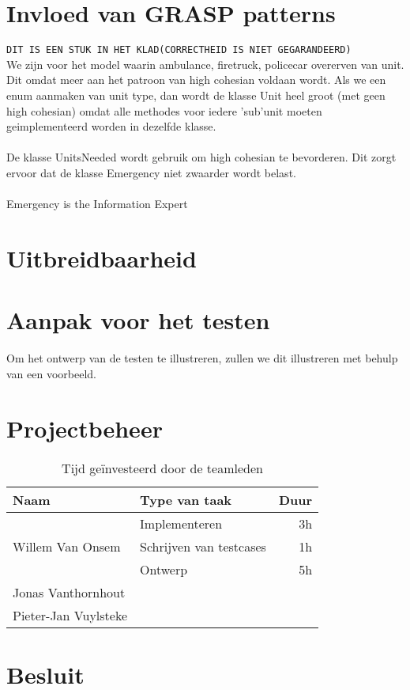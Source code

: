\documentclass[a4paper, titlepage,12pt]{article}
\begin{document}
\section{Invloed van GRASP patterns}
\verb+DIT IS EEN STUK IN HET KLAD(CORRECTHEID IS NIET GEGARANDEERD)+\\
We zijn voor het model waarin ambulance, firetruck, policecar overerven van unit. Dit omdat meer aan het patroon van high cohesian voldaan wordt. Als we een enum aanmaken van unit type, dan wordt de klasse Unit heel groot (met geen high cohesian) omdat alle methodes voor iedere 'sub'unit moeten geimplementeerd worden in dezelfde klasse.\\\\
De klasse UnitsNeeded wordt gebruik om high cohesian te bevorderen. Dit zorgt ervoor dat de klasse Emergency niet zwaarder wordt belast.\\\\
Emergency is the Information Expert   
\label{grasp}
\newpage
\section{Uitbreidbaarheid}
\label{uitbreidbaarheid}
\newpage
\section{Aanpak voor het testen}
\label{testen}
Om het ontwerp van de testen te illustreren, zullen we dit illustreren met behulp van een voorbeeld.

\newpage
\section{Projectbeheer}
\label{projectbeheer}
\begin{table}[H]
\centering
\begin{tabular}{|llr|}
\hline
Naam&Type van taak&Duur\\
\hline
\hline
\multirow{3}{*}{Willem Van Onsem}&Implementeren&3h\\
&Schrijven van testcases&1h\\
&Ontwerp&5h\\
\hline
Jonas Vanthornhout&&\\
\hline
Pieter-Jan Vuylsteke&&\\
\hline
\end{tabular}
\caption{Tijd ge\"investeerd door de teamleden}
\label{tbl:timeUsage}
\end{table}
\newpage
\section{Besluit}
\label{besluit}
\newpage
\nocite{*}


\end{document}
